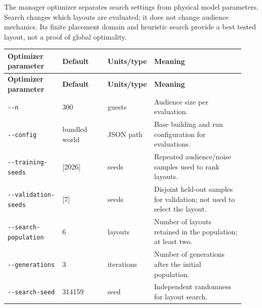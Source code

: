 \documentclass[11pt]{article}
\begin{document}
The manager optimizer separates search settings from physical model parameters. Search changes which layouts are evaluated; it does not change audience mechanics. Its finite placement domain and heuristic search provide a best tested layout, not a proof of global optimality.


{\small\setlength{\tabcolsep}{4pt}

\begin{longtable}{@{}p{0.23\linewidth}p{0.19\linewidth}p{0.13\linewidth}p{0.38\linewidth}@{}}

\toprule

\textbf{Optimizer parameter} & \textbf{Default} & \textbf{Units/type} & \textbf{Meaning} \\

\midrule\endfirsthead

\toprule

\textbf{Optimizer parameter} & \textbf{Default} & \textbf{Units/type} & \textbf{Meaning} \\

\midrule\endhead

\bottomrule\endfoot

\texttt{-\allowbreak{}-\allowbreak{}n} & 300 & guests & Audience size per evaluation. \\

\texttt{-\allowbreak{}-\allowbreak{}config} & bundled world & JSON path & Base building and run configuration for evaluations. \\

\texttt{-\allowbreak{}-\allowbreak{}training-\allowbreak{}seeds} & [2026] & seeds & Repeated audience/noise samples used to rank layouts. \\

\texttt{-\allowbreak{}-\allowbreak{}validation-\allowbreak{}seeds} & [7] & seeds & Disjoint held-out samples for validation; not used to select the layout. \\

\texttt{-\allowbreak{}-\allowbreak{}search-\allowbreak{}population} & 6 & layouts & Number of layouts retained in the population; at least two. \\

\texttt{-\allowbreak{}-\allowbreak{}generations} & 3 & iterations & Number of generations after the initial population. \\

\texttt{-\allowbreak{}-\allowbreak{}search-\allowbreak{}seed} & 314159 & seed & Independent randomness for layout search. \\


\end{longtable}}
\end{document}
